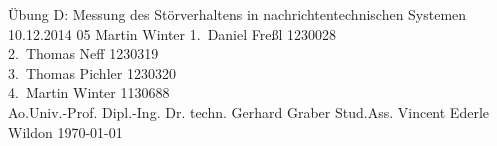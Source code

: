 \TUHeader                          %
{Übung D: Messung des Störverhaltens in nachrichtentechnischen Systemen}                       %
{10.12.2014}                        %
{05}                            %
{Martin Winter}                   %
{
1.~Daniel Freßl 1230028\\
2.~Thomas Neff 1230319\\                    %
3.~Thomas Pichler 1230320\\ 
4.~Martin Winter 1130688 \\                 %
}
{Ao.Univ.-Prof. Dipl.-Ing. Dr. techn. Gerhard Graber}
{Stud.Ass. Vincent Ederle}                          %
{Wildon}                              %
{\today}                            %




\pagebreak
  
\tableofcontents
  
\pagebreak